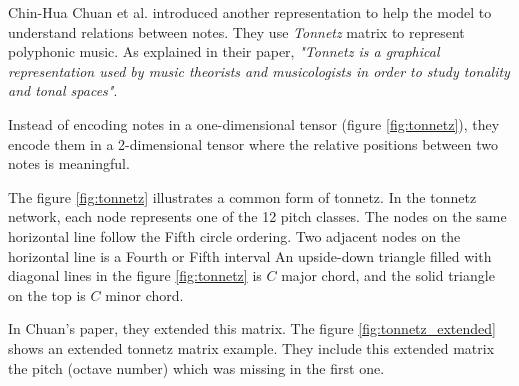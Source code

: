 \documentclass[12pt]{report}
\begin{document}
\bigskip

Chin-Hua Chuan et al. \cite{chuan_modeling_nodate} introduced another representation to help the model to understand relations between notes.
They use \textit{Tonnetz} matrix \cite{mason_essential_nodate} to represent polyphonic music.
As explained in their paper, \textit{"Tonnetz is a graphical representation used by music theorists and musicologists in order to study tonality and tonal spaces"}.

Instead of encoding notes in a one-dimensional tensor (figure \ref{fig:tonnetz}), they encode them in a 2-dimensional tensor where the relative positions between two notes is meaningful.

The figure \ref{fig:tonnetz} illustrates a common form of tonnetz.
In the tonnetz network, each node represents one of the 12 pitch classes.
The nodes on the same horizontal line follow the Fifth circle ordering. Two adjacent nodes on the horizontal line is a Fourth or Fifth interval
An upside-down triangle filled with diagonal lines in the figure \ref{fig:tonnetz} is $C$ major chord, and the solid triangle on the top is $C$ minor chord.

In Chuan's paper, they extended this matrix.
The figure \ref{fig:tonnetz_extended} shows an extended tonnetz matrix example.
They include this extended matrix the pitch (octave number) which was missing in the first one.
\end{document}
